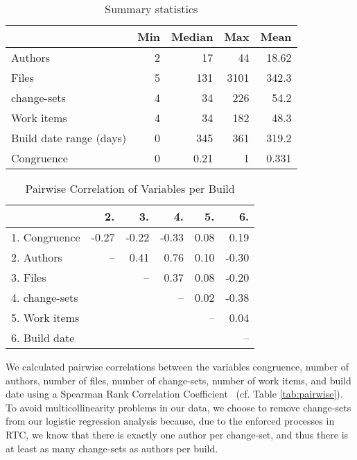 \begin{table}[t]
\centering
\caption{Summary statistics}
\label{tab:pairwise}
\begin{tabular}{lrrrr}
\toprule
 & Min & Median & Max & Mean\\\midrule
Authors & 2 & 17 & 44 & 18.62\\
Files & 5 & 131 & 3101 & 342.3 \\
change-sets & 4  & 34  & 226 & 54.2\\
Work items & 4 & 34  & 182 & 48.3 \\
Build date range (days) & 0  & 345  & 361 & 319.2 \\
Congruence & 0  & 0.21  & 1 & 0.331 \\
\bottomrule
\end{tabular}
\label{tab:summary}
\end{table}

\begin{table}[t]
\begin{center}
\caption{Pairwise Correlation of Variables per Build}
\begin{tabular}{lrrrrr}
\toprule
 & 2. & 3. & 4. & 5. & 6. \\ 
  \midrule
   1. Congruence  & -0.27 & -0.22 & -0.33 & 0.08 & 0.19 \\ 
   2. Authors & --& 0.41 & 0.76 & 0.10 & -0.30 \\ 
   3. Files &  & --& 0.37 & 0.08 & -0.20 \\ 
   4. change-sets &  &  &  --& 0.02 & -0.38 \\ 
   5. Work items  &  &  &  &  --& 0.04 \\ 
   6. Build date &  &  &  &  & -- \\ 
\bottomrule
\end{tabular}
\end{center}
\end{table}

We calculated pairwise correlations between the variables congruence, number of authors, number of files, number of change-sets, number of work items, and build date using a Spearman Rank Correlation Coefficient~\cite{Sheskin2000} (cf. Table \ref{tab:pairwise}). To avoid multicollinearity problems in our data, we choose to remove change-sets from our logistic regression analysis because, due to the enforced processes in RTC, we know that there is exactly one author per change-set, and thus there is at least as many change-sets as authors per build.

